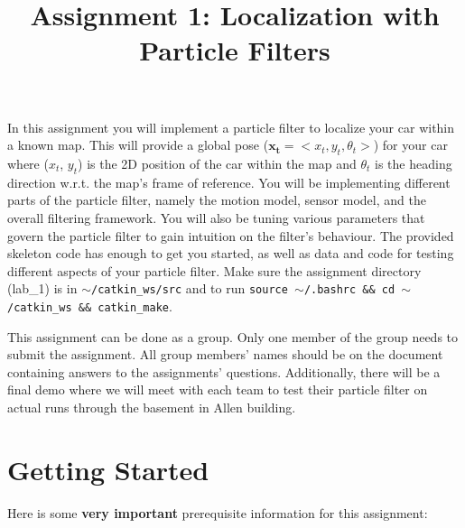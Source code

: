 \documentclass[final]{article}
\title{Assignment 1: Localization with Particle Filters}
\newcommand{\code}[1]{\texttt{#1}}
\begin{document}

\maketitle

In this assignment you will implement a particle filter to localize your car within a known map. This will provide a global pose ($\mathbf{x_t} = <x_t, y_t, \theta_t>$) for your car where ($x_t$, $y_t$) is the 2D position of the car within the map and $\theta_t$ is the heading direction w.r.t. the map's frame of reference. You will be implementing different parts of the particle filter, namely the motion model, sensor model, and the overall filtering framework. You will also be tuning various parameters that govern the particle filter to gain intuition on the filter's behaviour. The provided skeleton code has enough to get you started, as well as data and code for testing different aspects of your particle filter. Make sure the assignment directory (lab\_1) is in \code{$\sim$/catkin\_ws/src} and to run \code{source $\sim$/.bashrc \&\& cd $\sim$/catkin\_ws \&\& catkin\_make}.

This assignment can be done as a group. Only one member of the group needs to submit the assignment. All group members' names should be on the document containing answers to the assignments' questions. Additionally, there will be a final demo where we will meet with each team to test their particle filter on actual runs through the basement in Allen building.

\section{Getting Started}

Here is some \textbf{very important} prerequisite information for this assignment:
\end{document}
